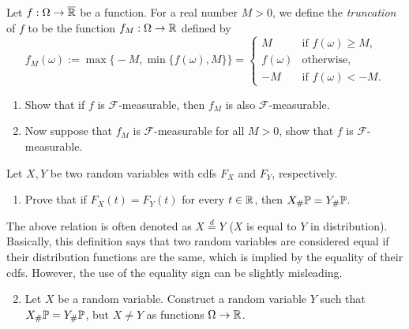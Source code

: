 \begin{problem}[Truncation]\label{pb:truncation}
	Let $f:\Omega\to\overline{\mathbb R}$ be a function. For a real number $M>0$, we define the \emph{truncation} of $f$ to be the function $f_M:\Omega\to \mathbb R$ defined by
	\[
		f_M(\omega) := \max\bigl\{ -M, \min\bigl\{ f(\omega),M\bigr\}\bigr\} = \begin{cases}
			M & \text{if $f(\omega)\ge M$,} \\
			f(\omega) & \text{otherwise}, \\
			-M & \text{if $f(\omega)< -M$.}
		\end{cases}
	\]
	\begin{enumerate}[label=(\alph*)]
		\item Show that if $f$ is $\mathcal{F}$-measurable, then $f_M$ is also $\mathcal{F}$-measurable.
		
		\item Now suppose that $f_M$ is $\mathcal{F}$-measurable for all $M>0$, show that $f$ is $\mathcal{F}$-measurable.
	\end{enumerate}
\end{problem}

\begin{problem}
Let $X,Y$ be two random variables with cdfs $F_X$ and $F_Y$, respectively. 
\begin{enumerate}[label=(\alph*)]
\item Prove that if $F_X(t) = F_Y(t)$ for every $t \in \mathbb R$, then $X_\# \mathbb P = Y_\# \mathbb P$. 
\end{enumerate}
The above relation is often denoted as $X \stackrel{d}{=} Y$ ($X$ is equal to $Y$ in distribution). Basically, this definition says that two random variables are considered equal if their distribution functions are the same, which is implied by the equality of their cdfs. However, the use of the equality sign can be slightly misleading.
\begin{enumerate}
\setcounter{enumi}{1}
\item Let $X$ be a random variable. Construct a random variable $Y$ such that $X_\# \mathbb P = Y_\# \mathbb P$, but $X \ne Y$ as functions $\Omega \to \mathbb R$.
\end{enumerate}
\end{problem}

